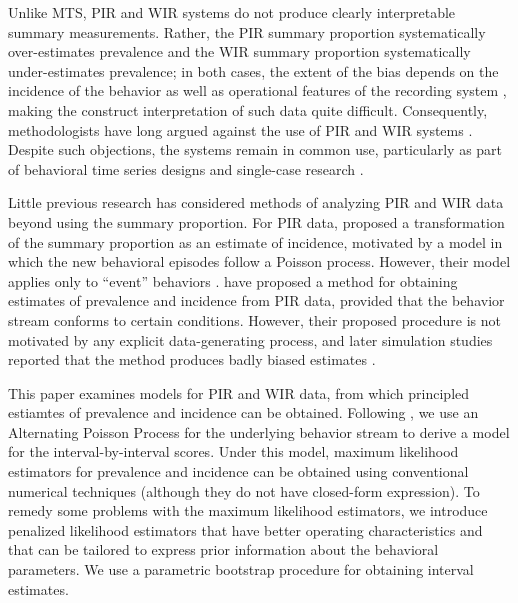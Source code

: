 \documentclass[man, noextraspace, floatsintext]{apa6}\usepackage[]{graphicx}\usepackage[]{color}
\begin{document}
Unlike MTS, PIR and WIR systems do not produce clearly interpretable summary measurements. Rather, the PIR summary proportion systematically over-estimates prevalence and the WIR summary proportion systematically under-estimates prevalence; in both cases, the extent of the bias depends on the incidence of the behavior as well as operational features of the recording system \citep{Kraemer1979one, Rogosa1991statistical}, making the construct interpretation of such data quite difficult. Consequently, methodologists have long argued against the use of PIR and WIR systems \citep[cf.]{Altmann1974observational, Mann1991time, Lane2014using}. Despite such objections, the systems remain in common use, particularly as part of behavioral time series designs and single-case research \citep{Rapp2007interval, Mudford2009continuous, Lane2014using}. 

Little previous research has considered methods of analyzing PIR and WIR data beyond using the summary proportion. For PIR data, \citet{Altmann1970estimating} proposed a transformation of the summary proportion as an estimate of incidence, motivated by a model in which the new behavioral episodes follow a Poisson process. However, their model applies only to ``event'' behaviors \citep{Altmann1974observational}. \citet{Suen1986post, Suen1989analyzing} have proposed a method for obtaining estimates of prevalence and incidence from PIR data, provided that the behavior stream conforms to certain conditions. However, their proposed procedure is not motivated by any explicit data-generating process, and later simulation studies reported that the method produces badly biased estimates \citep[sec. 5.2]{Rogosa1991statistical}. 

This paper examines models for PIR and WIR data, from which principled estiamtes of prevalence and incidence can be obtained. Following \citet{Brown1977estimation}, we use an Alternating Poisson Process for the underlying behavior stream to derive a model for the interval-by-interval scores. Under this model, maximum likelihood estimators for prevalence and incidence can be obtained using conventional numerical techniques (although they do not have closed-form expression). To remedy some problems with the maximum likelihood estimators, we introduce penalized likelihood estimators that have better operating characteristics and that can be tailored to express prior information about the behavioral parameters. We use a parametric bootstrap procedure for obtaining interval estimates.
\end{document}
